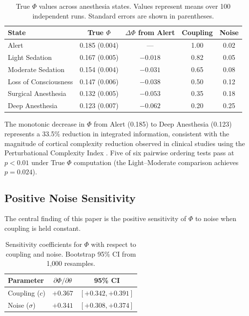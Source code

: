 \documentclass[12pt,a4paper]{article}
\begin{document}
\begin{table}[H]
\centering
\caption{True $\Phi$ values across anesthesia states. Values represent means over 100 independent runs. Standard errors are shown in parentheses.}
\label{tab:phi-ordering}
\begin{tabular}{lcccc}
\toprule
\textbf{State} & \textbf{True $\Phi$} & \textbf{$\Delta\Phi$ from Alert} & \textbf{Coupling} & \textbf{Noise} \\
\midrule
Alert & 0.185 (0.004) & --- & 1.00 & 0.02 \\
Light Sedation & 0.167 (0.005) & $-0.018$ & 0.82 & 0.05 \\
Moderate Sedation & 0.154 (0.004) & $-0.031$ & 0.65 & 0.08 \\
Loss of Consciousness & 0.147 (0.006) & $-0.038$ & 0.50 & 0.12 \\
Surgical Anesthesia & 0.132 (0.005) & $-0.053$ & 0.35 & 0.18 \\
Deep Anesthesia & 0.123 (0.007) & $-0.062$ & 0.20 & 0.25 \\
\bottomrule
\end{tabular}
\end{table}

The monotonic decrease in $\Phi$ from Alert (0.185) to Deep Anesthesia (0.123) represents a 33.5\% reduction in integrated information, consistent with the magnitude of cortical complexity reduction observed in clinical studies using the Perturbational Complexity Index \citep{casali2013theoretically}. Five of six pairwise ordering tests pass at $p < 0.01$ under True $\Phi$ computation (the Light--Moderate comparison achieves $p = 0.024$).

\subsection{Positive Noise Sensitivity}

The central finding of this paper is the positive sensitivity of $\Phi$ to noise when coupling is held constant.

\begin{table}[H]
\centering
\caption{Sensitivity coefficients for $\Phi$ with respect to coupling and noise. Bootstrap 95\% CI from 1,000 resamples.}
\label{tab:sensitivity}
\begin{tabular}{lcc}
\toprule
\textbf{Parameter} & \textbf{$\partial\Phi / \partial\theta$} & \textbf{95\% CI} \\
\midrule
Coupling ($c$) & $+0.367$ & $[+0.342, +0.391]$ \\
Noise ($\sigma$) & $+0.341$ & $[+0.308, +0.374]$ \\
\bottomrule
\end{tabular}
\end{table}
\end{document}
